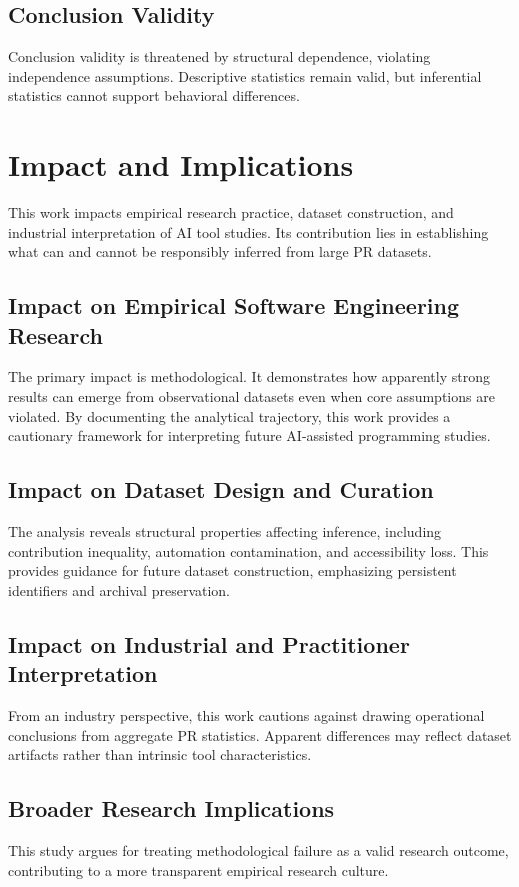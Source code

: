 \documentclass[conference]{IEEEtran}
\begin{document}
\subsection{Conclusion Validity}
Conclusion validity is threatened by structural dependence, violating independence assumptions. Descriptive statistics remain valid, but inferential statistics cannot support behavioral differences.

\section{Impact and Implications}

This work impacts empirical research practice, dataset construction, and industrial interpretation of AI tool studies. Its contribution lies in establishing what can and cannot be responsibly inferred from large PR datasets.

\subsection{Impact on Empirical Software Engineering Research}
The primary impact is methodological. It demonstrates how apparently strong results can emerge from observational datasets even when core assumptions are violated. By documenting the analytical trajectory, this work provides a cautionary framework for interpreting future AI-assisted programming studies.

\subsection{Impact on Dataset Design and Curation}
The analysis reveals structural properties affecting inference, including contribution inequality, automation contamination, and accessibility loss. This provides guidance for future dataset construction, emphasizing persistent identifiers and archival preservation.

\subsection{Impact on Industrial and Practitioner Interpretation}
From an industry perspective, this work cautions against drawing operational conclusions from aggregate PR statistics. Apparent differences may reflect dataset artifacts rather than intrinsic tool characteristics.

\subsection{Broader Research Implications}
This study argues for treating methodological failure as a valid research outcome, contributing to a more transparent empirical research culture.
\end{document}
